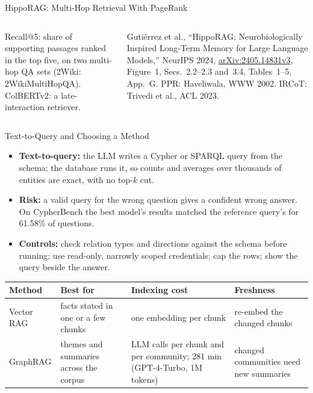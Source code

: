 \begin{frame}{HippoRAG: Multi-Hop Retrieval With PageRank}
\begin{columns}[T,onlytextwidth]
      \vspace{0.4em}
      {\scriptsize Recall@5: share of supporting passages ranked in the top five, on two multi-hop QA sets (2Wiki: 2WikiMultiHopQA). ColBERTv2: a late-interaction retriever.\par}
      \vspace{0.4em}
      {\scriptsize Guti\'errez et al., ``HippoRAG: Neurobiologically Inspired Long-Term Memory for Large Language Models,'' NeurIPS 2024, \href{https://arxiv.org/abs/2405.14831v3}{arXiv:2405.14831v3}, Figure~1, Secs.~2.2--2.3 and~3.4, Tables~1--5, App.~G. PPR: Haveliwala, WWW 2002. IRCoT: Trivedi et al., ACL 2023.\par}
  \end{columns}
\end{frame}

\begin{frame}{Text-to-Query and Choosing a Method}
  \begin{itemize}\footnotesize\itemsep0.3em
    \item[\textcolor{red}{$\blacktriangleright$}] \textbf{Text-to-query:} the LLM writes a Cypher or SPARQL query from the schema; the database runs it, so counts and averages over thousands of entities are exact, with no top-$k$ cut.
    \item[\textcolor{red}{$\blacktriangleright$}] \textbf{Risk:} a valid query for the wrong question gives a confident wrong answer. On CypherBench the best model's results matched the reference query's for 61.58\% of questions.
    \item[\textcolor{red}{$\blacktriangleright$}] \textbf{Controls:} check relation types and directions against the schema before running; use read-only, narrowly scoped credentials; cap the rows; show the query beside the answer.
  \end{itemize}
  \vspace{0.2em}
  {\centering\scriptsize
  \begin{tabular}{>{\raggedright\arraybackslash}p{1.8cm} >{\raggedright\arraybackslash}p{2.8cm} >{\raggedright\arraybackslash}p{4.4cm} >{\raggedright\arraybackslash}p{2.9cm}}
    \toprule
    \textbf{Method} & \textbf{Best for} & \textbf{Indexing cost} & \textbf{Freshness} \\
    \midrule
    Vector RAG & facts stated in one or a few chunks & one embedding per chunk & re-embed the changed chunks \\
    \addlinespace[0.15em]
    GraphRAG & themes and summaries across the corpus & LLM calls per chunk and per community; 281 min (GPT-4-Turbo, 1M tokens) & changed communities need new summaries \\

\end{tabular}}
\end{frame}
